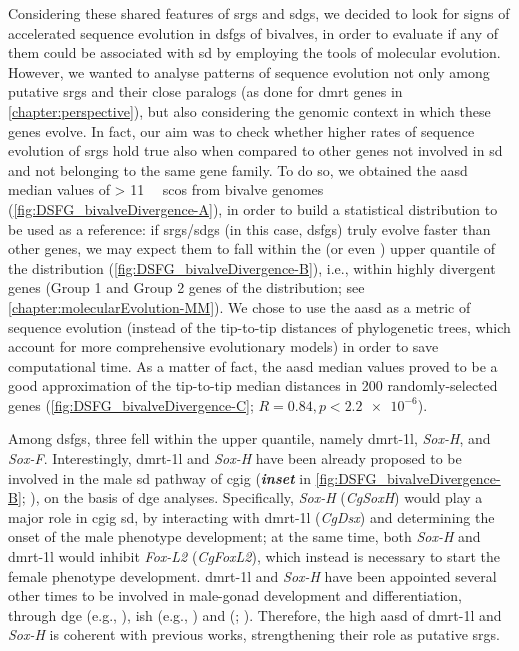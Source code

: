 Considering these shared features of \glspl{srg} and \glspl{sdg}, we decided to look for signs of accelerated sequence evolution in \glspl{dsfg} of bivalves, in order to evaluate if any of them could be associated with \gls{sd} by employing the tools of molecular evolution. However, we wanted to analyse patterns of sequence evolution not only among putative \glspl{srg} and their close paralogs (as done for \gls{dmrt} genes in \cref{chapter:perspective}), but also considering the genomic context in which these genes evolve. In fact, our aim was to check whether higher rates of sequence evolution of \glspl{srg} hold true also when compared to other genes not involved in \gls{sd} and not belonging to the same gene family. To do so, we obtained the \gls{aasd} median values of \qty{> 11}{\kilo\nothing} \glspl{sco} from bivalve genomes (\cref{fig:DSFG_bivalveDivergence-A}), in order to build a statistical distribution to be used as a reference: if \glspl{srg}/\glspl{sdg} (in this case, \glspl{dsfg}) truly evolve faster than other genes, we may expect them to fall within the \fivepercent{} (or even \onepercent{}) upper quantile of the distribution (\cref{fig:DSFG_bivalveDivergence-B}), i.e., within highly divergent genes (Group 1 and Group 2 genes of the distribution; see \cref{chapter:molecularEvolution-MM}). We chose to use the \gls{aasd} as a metric of sequence evolution (instead of the tip-to-tip distances of phylogenetic trees, which account for more comprehensive evolutionary models) in order to save computational time. As a matter of fact, the \gls{aasd} median values proved to be a good approximation of the tip-to-tip median distances in 200 randomly-selected genes (\cref{fig:DSFG_bivalveDivergence-C}; $R = 0.84, p < \num{2.2e-6}$).

Among \glspl{dsfg}, three fell within the \fivepercent{} upper quantile, namely \gls{dmrt-1l}, \textit{Sox-H}, and \textit{Sox-F}. Interestingly, \gls{dmrt-1l} and \textit{Sox-H} have been already proposed to be involved in the male \gls{sd} pathway of \gls{cgig} (\textbf{\textit{inset}} in \cref{fig:DSFG_bivalveDivergence-B}; ), on the basis of \gls{dge} analyses. Specifically, \textit{Sox-H} (\textit{CgSoxH}) would play a major role in \gls{cgig} \gls{sd}, by interacting with \gls{dmrt-1l} (\textit{CgDsx}) and determining the onset of the male phenotype development; at the same time, both \textit{Sox-H} and \gls{dmrt-1l} would inhibit \textit{Fox-L2} (\textit{CgFoxL2}), which instead is necessary to start the female phenotype development. \gls{dmrt-1l} and \textit{Sox-H} have been appointed several other times to be involved in male-gonad development and differentiation, through \gls{dge} (e.g., ), \gls{ish} (e.g., ) and  (; ). Therefore, the high \gls{aasd} of \gls{dmrt-1l} and \textit{Sox-H} is coherent with previous works, strengthening their role as putative \glspl{srg}.

